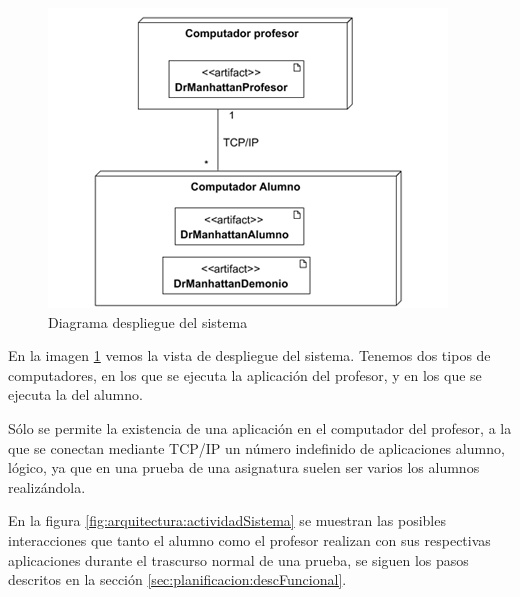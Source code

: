 \begin{figure}
    \centering
    \includegraphics[width=.75\linewidth]{arquitectura/yeah}
    \caption{Diagrama despliegue del sistema}
    \label{fig:arquitectura:despliegueSistema}
\end{figure}

En la imagen \ref{fig:arquitectura:despliegueSistema} vemos la vista de despliegue del sistema. Tenemos dos tipos de computadores, en los que se ejecuta la aplicación del profesor, y en los que se ejecuta la del alumno.
\newline

Sólo se permite la existencia de una aplicación en el computador del profesor, a la que se conectan mediante TCP/IP un número indefinido de aplicaciones alumno, lógico, ya que en una prueba de una asignatura suelen ser varios los alumnos realizándola.
\newline


En la figura \ref{fig:arquitectura:actividadSistema} se muestran las posibles interacciones que tanto el alumno como el profesor realizan con sus respectivas aplicaciones durante el trascurso normal de una prueba, se siguen los pasos descritos en la sección \ref{sec:planificacion:descFuncional}.


